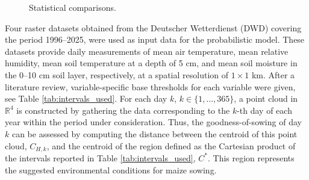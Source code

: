 \documentclass[isoft]{ssltexposter}
\begin{document}
\begin{poster}
\begin{figure}
{{
		}
}
	\caption{Statistical comparisons.}
\end{figure}
\fi



Four raster datasets obtained from the Deutscher Wetterdienst (DWD) \cite{DWD_soilmoisture_maize, DWD_soiltemperature, DWD_HYRAS_RelHumidity, DWD_HYRAS_MeanTemp} covering the period 1996--2025, were used as input data for the probabilistic model. These datasets provide daily measurements of mean air temperature, mean relative humidity, mean soil temperature at a depth of 5 cm, and mean soil moisture in the 0--10 cm soil layer, respectively, at a spatial resolution of $1 \times 1$ km. After a literature review, variable-specific base thresholds for each variable were given, see Table \ref{tab:intervals_used}. For each day $k$, $k \in \{1,\ldots, 365\}$, a point cloud in $\mathbb{R}^4$ is constructed by gathering the data corresponding to the $k$-th day of each year within the period under consideration. Thus, the goodness-of-sowing of day $k$ can be assessed by computing the distance between the centroid of this point cloud, $C_{H,k}$, and the centroid of the region defined as the Cartesian product of the intervals reported in Table \ref{tab:intervals_used}, $C^*$. This region represents the suggested environmental conditions for maize sowing.





\end{poster}
\end{document}
